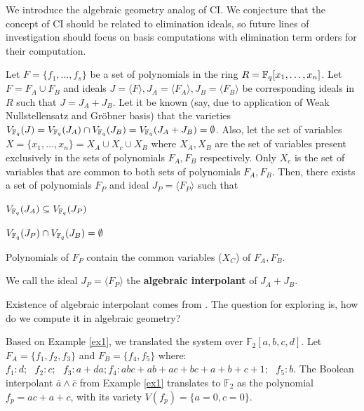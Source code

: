We introduce the algebraic geometry analog of CI.
We conjecture that the
  concept of CI should be related to elimination ideals, so future lines
  of investigation should focus on \Grobner basis computations with
  elimination term orders for their computation.



\begin{Definition}\label{ci}
Let $F = \{f_1, \dots, f_s\}$ be a set of polynomials in the ring 
$R = {\mathbb{F}}_{q}[x_1,\dots,x_n]$. Let $F = F_A \cup F_B$ and ideals $J =
\langle F \rangle, J_A = \langle F_A \rangle, J_B = \langle F_B
\rangle$ be corresponding ideals in $R$ such that $J = J_A + J_B$. Let
it be known (say, due to application of Weak Nullstellensatz and
Gr\"obner basis) that the varieties $V_{{\mathbb{F}}_{q}}(J) = V_{{\mathbb{F}}_{q}}(J_A) \cap
V_{{\mathbb{F}}_{q}}(J_B) =V_{{\mathbb{F}}_{q}}(J_A+J_B)=\emptyset$. Also, let the set of
variables $X = \{x_1,\dots,x_n\} = X_A \cup X_c \cup X_B$ where $X_A,
X_B$ are the set of variables present exclusively in the sets of
polynomials $F_A, F_B$ respectively. Only $X_c$ is the set of
variables that are common to both sets of polynomials $F_A,
F_B$. Then, there exists a set of polynomials  $F_P$ and ideal $J_P =
\langle F_P \rangle$ such that 
\bi
\item $V_{{\mathbb{F}}_{q}}(J_A) \subseteq V_{{\mathbb{F}}_{q}}(J_P)$
\item $V_{{\mathbb{F}}_{q}}(J_P) \cap V_{{\mathbb{F}}_{q}}(J_B) = \emptyset$
\item Polynomials of $F_P$ contain the common variables ($X_C$) of
  $F_A, F_B$. 
\ei

We call the ideal $J_P = \langle F_P\rangle$ the {\bf algebraic
  interpolant} of  $J_A+J_B$. 
\end{Definition}

Existence of algebraic interpolant comes from \cite{craig-interpolate}.
The question for exploring is, how do we compute it in algebraic geometry?

\begin{Example} \label{ex2}
Based on Example \ref{ex1}, we translated the system over
$\mathbb{F}_2[a, b, c, d]$. Let $F_A = \{f_1, f_2, f_3\}$ and $F_B =
\{f_4, f_5\}$ where: $f_1: d; ~~~f_2: c; ~~~f_3: a + da; f_4:  abc +
ab + ac + bc + a + b + c + 1; ~~~f_5: b.$ The Boolean interpolant
$\overline{a}\wedge\overline{c}$ from Example \ref{ex1} translates to
${\mathbb{F}}_2$ as the polynomial $f_p = ac + a + c$, with its
variety $V(f_p) = \{a=0, c=0\}$.   
\end{Example}


